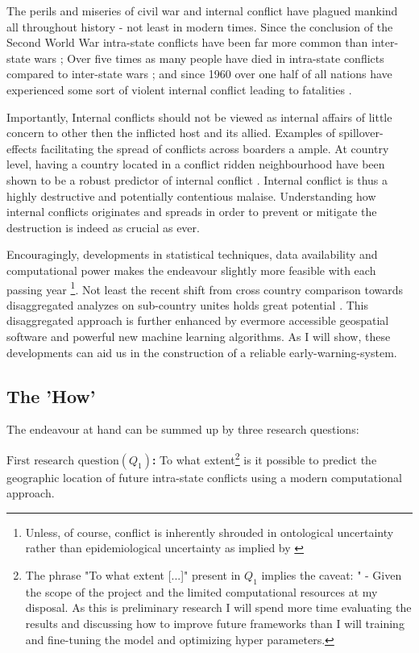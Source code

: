 \documentclass[a4paper]{article}
\begin{document}
The perils and miseries of civil war and internal conflict have plagued mankind all throughout history - not least in modern times. Since the conclusion of the Second World War intra-state conflicts have been far more common than inter-state wars \citep[563]{Collier_Hoeffler_2004}; Over five times as many people have died in intra-state conflicts compared to inter-state wars \citep[563]{Collier_Hoeffler_2004}; and since 1960 over one half of all nations have experienced some sort of violent internal conflict leading to fatalities \citep[3-4]{Blattman_Miguel_2010}.\par

Importantly, Internal conflicts should not be viewed as internal affairs of little concern to other then the inflicted host and its allied. Examples of spillover-effects facilitating the spread of conflicts across boarders a ample. At country level, having a country located in a conflict ridden neighbourhood have been shown to be a robust predictor of internal conflict \citep{Hegre_Sambanis_2006,Goldstone_2010}. Internal conflict is thus a highly destructive and potentially contentious malaise. Understanding how internal conflicts originates and spreads in order to prevent or mitigate the destruction is indeed as crucial as ever.\par

Encouragingly, developments in statistical techniques, data availability and computational power makes the endeavour slightly more feasible with each passing year \footnote{Unless, of course, conflict is inherently shrouded in ontological uncertainty rather than epidemiological uncertainty as implied by \cite{Gartzke_1999}}. Not least the recent shift from cross country comparison towards disaggregated analyzes on sub-country unites holds great potential \citep{Cederman_Gleditsch_2009}. This disaggregated approach is further enhanced by evermore accessible geospatial software and powerful new machine learning algorithms. As I will show, these developments can aid us in the construction of a reliable early-warning-system.\par

\subsection{The 'How'}

The endeavour at hand can be summed up by three research questions:\par

\textbf{$\textrm{First research question} (Q_{1})$:} To what extent\footnote{The phrase "To what extent [...]" present in $Q_1$ implies the caveat: " - Given the scope of the project and the limited computational resources at my disposal. As this is preliminary research I will spend more time evaluating the results and discussing how to improve future frameworks than I will training and fine-tuning the model and optimizing hyper parameters.} is it possible to predict the geographic location of future intra-state conflicts using a modern computational approach.\par
\end{document}

